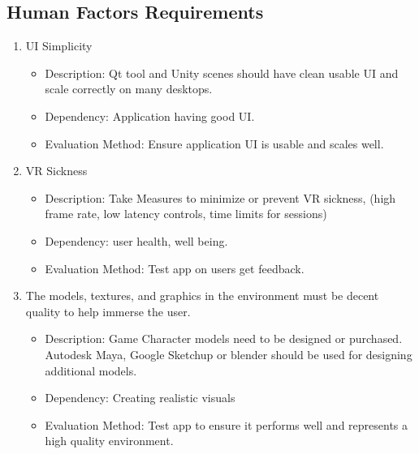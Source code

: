\documentclass[a4paper,10pt]{article}
\begin{document}
	\subsection{Human Factors Requirements} %
	\begin{enumerate}
	\item UI Simplicity
	    \begin{itemize}
	      \item Description: Qt tool and Unity scenes should have clean usable UI and scale correctly on many desktops.
	      \item Dependency:  Application having good UI.
	      \item Evaluation Method: Ensure application UI is usable and scales well.
	    \end{itemize}
	\item VR Sickness	 
	    \begin{itemize}
	      \item Description: Take Measures to minimize or prevent VR sickness, (high frame rate, low latency controls, time limits for sessions)
	      \item Dependency: user health, well being.
	      \item Evaluation Method: Test app on users get feedback.
	    \end{itemize}
	\item The models, textures, and graphics in the environment must be decent quality to help immerse the user.
	    \begin{itemize}	%
	      \item Description: Game Character models need to be designed or purchased. Autodesk Maya, Google Sketchup or blender should be used for designing additional models. 
	      \item Dependency: Creating realistic visuals 
	      \item Evaluation Method: Test app to ensure it performs well and represents a high quality environment.
	    \end{itemize}
	\end{enumerate}
	
\end{document}
